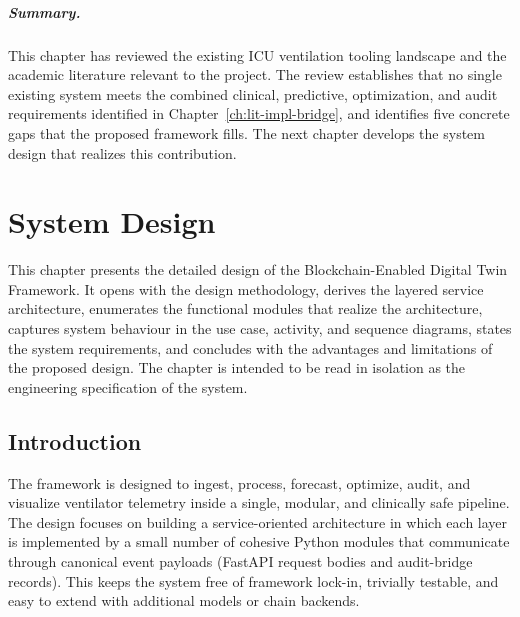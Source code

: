 \documentclass[12pt,a4paper,oneside]{report}
\begin{document}
\paragraph{Summary.} This chapter has reviewed the existing ICU ventilation tooling landscape and the academic literature relevant to the project. The review establishes that no single existing system meets the combined clinical, predictive, optimization, and audit requirements identified in Chapter~\ref{ch:lit-impl-bridge}, and identifies five concrete gaps that the proposed framework fills. The next chapter develops the system design that realizes this contribution.

\chapter{System Design}
\label{ch:design}
\label{ch:lit-impl-bridge}

This chapter presents the detailed design of the Blockchain-Enabled Digital Twin Framework. It opens with the design methodology, derives the layered service architecture, enumerates the functional modules that realize the architecture, captures system behaviour in the use case, activity, and sequence diagrams, states the system requirements, and concludes with the advantages and limitations of the proposed design. The chapter is intended to be read in isolation as the engineering specification of the system.

\section{Introduction}
The framework is designed to ingest, process, forecast, optimize, audit, and visualize ventilator telemetry inside a single, modular, and clinically safe pipeline. The design focuses on building a service-oriented architecture in which each layer is implemented by a small number of cohesive Python modules that communicate through canonical event payloads (FastAPI request bodies and audit-bridge records). This keeps the system free of framework lock-in, trivially testable, and easy to extend with additional models or chain backends.
\end{document}
